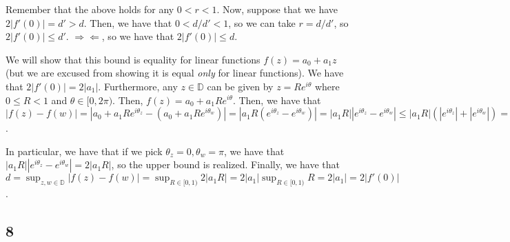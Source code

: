 \documentclass[12pt,letterpaper]{article}
\theoremstyle{definition}
\newcommand{\contra}{\Rightarrow\!\Leftarrow}
\begin{document}
Remember that the above holds for any $0 < r < 1$. Now, suppose that we have $2|f'(0)| = d' > d$. Then, we have that $0 < d/d'< 1$, so we can take $r = d/d'$, so $2|f'(0)| \leq d'$. $\contra$, so we have that $2|f'(0)| \leq d$.

We will show that this bound is equality for linear functions $f(z) = a_{0} + a_{1}z$ (but we are excused from showing it is equal \textit{only} for linear functions). We have that $2|f'(0)| = 2|a_{1}|$. Furthermore, any $z \in \mathbb{D}$ can be given by $z = Re^{i\theta}$ where $0 \leq R < 1$ and $\theta \in [0, 2\pi)$. Then, $f(z) = a_{0} + a_{1}Re^{i\theta}$. Then, we have that $|f(z) - f(w)| = |a_{0} + a_{1}Re^{i\theta_{z}} - (a_{0} + a_{1}Re^{i\theta_{w}})| = |a_{1}R(e^{i\theta_{z}} - e^{i\theta_{w}})| = |a_{1}R||e^{i\theta_{z}}-e^{i\theta_{w}}| \leq |a_{1}R|(|e^{i\theta_{z}}| + |e^{i\theta_{w}}|) = 2|a_{1}R|$.

In particular, we have that if we pick $\theta_{z} = 0, \theta_{w} = \pi$, we have that $|a_{1}R||e^{i\theta_{z}} - e^{i\theta_{w}}| = 2|a_{1}R|$, so the upper bound is realized. Finally, we have that $d = \sup_{z,w \in \mathbb{D}}|f(z) - f(w)| = \sup_{R \in [0,1)}2|a_{1}R| = 2|a_{1}|\sup_{R \in [0,1)}R = 2|a_{1}| = 2|f'(0)|$.

\subsection*{8}
\end{document}
